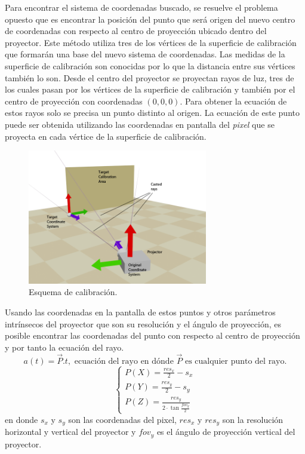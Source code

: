 Para encontrar el sistema de coordenadas buscado, se resuelve el problema opuesto que es encontrar la posición del punto que será origen del nuevo centro de coordenadas con respecto al centro de proyección ubicado dentro del proyector. Este método utiliza tres de los vértices de la superficie de calibración que formarán una base del nuevo sistema de coordenadas. Las medidas de la superficie de calibración son conocidas por lo que la distancia entre sus vértices también lo son. Desde el centro del proyector se proyectan rayos de luz, tres de los cuales pasan por los vértices de la superficie de calibración y también por el centro de proyección con coordenadas $(0, 0, 0)$. Para obtener la ecuación de estos rayos solo se precisa un punto distinto al origen. La ecuación de este punto puede ser obtenida utilizando las coordenadas en pantalla del \emph{pixel} que se proyecta en cada vértice de la superficie de calibración.
\begin{figure}[H]
  \centering
    \includegraphics[width=0.7\textwidth]{./Cap2_videomapping/CalibrationSketch}
  \caption{Esquema de calibración.}
  \label{fig:CalibrationSketch}
\end{figure}
Usando las coordenadas en la pantalla de estos puntos y otros parámetros intrínsecos del proyector que son su resolución y el ángulo de proyección, es posible encontrar las coordenadas del punto con respecto al centro de proyección y por tanto la ecuación del rayo.
\[
a(t) = \vec{P} . t,	\mbox{ ecuación del rayo en dónde } \vec{P} \mbox{ es cualquier punto del rayo.}
\]
\[
\begin{cases}
P(X) = \frac{res_x}{2} - s_x \\
P(Y) = \frac{res_y}{2} - s_y \\
P(Z) = \frac{res_y}{2 \cdot \tan \frac{fov_y}{2}}
\end{cases}
\]
en donde $s_x$ y $s_y$ son las coordenadas del pixel, $res_x$ y $res_y$ son la resolución horizontal y vertical del proyector y $fov_y$ es el ángulo de proyección vertical del proyector.

